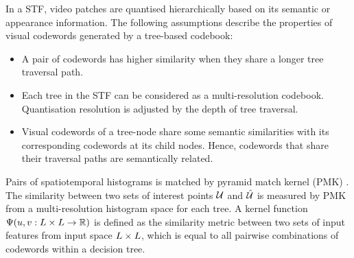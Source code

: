 In a STF, video patches are quantised hierarchically based on its semantic or appearance information. The following assumptions describe the properties of visual codewords generated by a tree-based codebook:
\begin{itemize}
	\item A pair of codewords has higher similarity when they share a longer tree traversal path. 
	\item Each tree in the STF can be considered as a multi-resolution codebook. Quantisation resolution is adjusted by the depth of tree traversal.
	\item Visual codewords of a tree-node share some semantic similarities with its corresponding codewords at its child nodes. Hence, codewords that share their traversal paths are semantically related. 
\end{itemize} 

Pairs of spatiotemporal histograms is matched by pyramid match kernel (PMK) \cite{Grauman2005}. 
The similarity between two sets of interest points $\mathcal{U}$ and $\mathcal{\hat{U}}$ is measured by PMK from a multi-resolution histogram space for each tree. 
A kernel function $\Psi(u,v: L \times L \rightarrow \mathbb{R})$ is defined as the similarity metric between two sets of input features from input space $L \times L$, which is equal to all pairwise combinations of codewords within a decision tree.  

